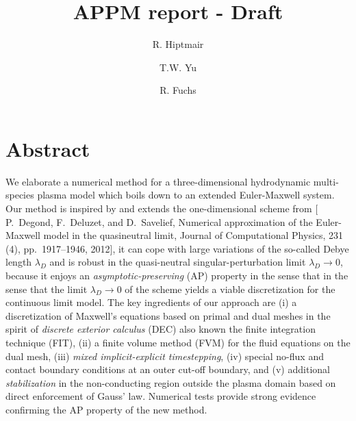 \documentclass{article}
\title{APPM report - Draft}
\author[1]{R. Hiptmair}
\author[1]{T.W. Yu}
\author[2]{R. Fuchs}
\affil[1]{Seminar for Applied Mathematics , ETH Z\"{u}rich}
\affil[2]{IET Institut für Energietechnik, OST}
\date{}
\newcommand{\todo}[1]{\textcolor{blue}{\fbox{\textbf{TODO: #1}}}}
\begin{document}
\maketitle

\section*{Abstract}

We elaborate a numerical method for a three-dimensional hydrodynamic multi-species plasma
model which boils down to an extended Euler-Maxwell system. Our method is inspired by and
extends the one-dimensional scheme from $[$P.~Degond, F.~Deluzet, and D.~Savelief,
Numerical approximation of the Euler-Maxwell model in the quasineutral limit, Journal of
Computational Physics, 231 (4), pp.~1917--1946, 2012$]$, it can cope with large variations
of the so-called Debye length $\lambda_D$ and is robust in the quasi-neutral
singular-perturbation limit $\lambda_D\to 0$, because it enjoys an
\emph{asymptotic-preserving} (AP) property in the sense that in the sense that the limit
$\lambda_D\to 0$ of the scheme yields a viable discretization for the continuous limit
model. The key ingredients of our approach are (i) a discretization of Maxwell's equations
based on primal and dual meshes in the spirit of \emph{discrete exterior calculus} (DEC)
also known the finite integration technique (FIT), (ii) a finite volume method (FVM) for
the fluid equations on the dual mesh, (iii) \emph{mixed implicit-explicit timestepping},
(iv) special no-flux and contact boundary conditions at an outer cut-off boundary, and (v)
additional \emph{stabilization} in the non-conducting region outside the plasma domain
based on direct enforcement of Gauss' law. Numerical tests provide strong evidence
confirming the AP property of the new method.



\end{document}
